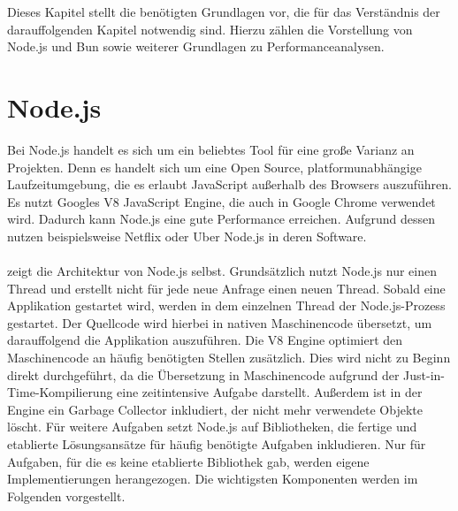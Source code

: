  \label{Grundlagen}
Dieses Kapitel stellt die benötigten Grundlagen vor, die für das Verständnis der darauffolgenden Kapitel notwendig sind. Hierzu zählen die Vorstellung von Node.js und Bun sowie weiterer Grundlagen zu Performanceanalysen.

\section{Node.js} \label{sec:Node.js}
Bei Node.js handelt es sich um ein beliebtes Tool für eine große Varianz an Projekten.  Denn es handelt sich um eine Open Source, platformunabhängige Laufzeitumgebung, die es erlaubt JavaScript außerhalb des Browsers auszuführen. Es nutzt Googles V8 JavaScript Engine, die auch in Google Chrome verwendet wird. Dadurch kann Node.js eine gute Performance erreichen. Aufgrund dessen nutzen beispielsweise Netflix oder Uber Node.js in deren Software. \cite{OpenJSFoundation.2022} \\

\noindent
{} \\
 
\noindent
{} zeigt die Architektur von Node.js selbst. Grundsätzlich nutzt Node.js nur einen Thread und erstellt nicht für jede neue Anfrage einen neuen Thread. Sobald eine Applikation gestartet wird, werden in dem einzelnen Thread der Node.js-Prozess gestartet. Der Quellcode wird hierbei in nativen Maschinencode übersetzt, um darauffolgend die Applikation auszuführen. Die V8 Engine optimiert den Maschinencode an häufig benötigten Stellen zusätzlich. Dies wird nicht zu Beginn direkt durchgeführt, da die Übersetzung in Maschinencode aufgrund der Just-in-Time-Kompilierung eine zeitintensive Aufgabe darstellt. Außerdem ist in der Engine ein Garbage Collector inkludiert, der nicht mehr verwendete Objekte löscht. \cite{Springer.2022} \newline 
Für weitere Aufgaben setzt Node.js auf Bibliotheken, die fertige und etablierte Lösungsansätze für häufig benötigte Aufgaben inkludieren. Nur für Aufgaben, für die es keine etablierte Bibliothek gab, werden eigene Implementierungen herangezogen. Die wichtigsten Komponenten werden im Folgenden vorgestellt. \cite{Springer.2022} \\

